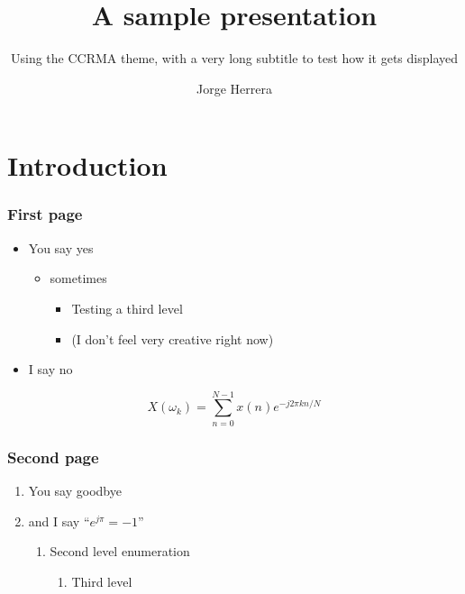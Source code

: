 \documentclass{beamer}
\title{A sample presentation}
\subtitle{Using the CCRMA theme, with a very long subtitle to test how it gets displayed}
\author{Jorge Herrera}
\date
\begin{document}
\begin{frame}[plain]
    \titlepage
\end{frame}
\addtocounter{framenumber}{-1}  %


\begin{frame}[plain]
    \tableofcontents
\end{frame}
\addtocounter{framenumber}{-1}  %

\section[Intro]{Introduction}
\begin{frame}[plain]
    \tableofcontents[currentsection]
\end{frame}
\addtocounter{framenumber}{-1}  %

\begin{frame}\frametitle{First page}
    \begin{itemize}
    \item You say yes
        \begin{itemize}
        \item sometimes
            \begin{itemize}
            \item Testing a third level
            \item (I don't feel very creative right now)
            \end{itemize}
        \end{itemize}
    \item I say no
    \end{itemize}

    \begin{equation}
    X(\omega_k) = \sum_{n=0}^{N-1}x(n)e^{-j2\pi kn/N}
    \end{equation}

\end{frame}

\begin{frame}\frametitle{Second page}
    \begin{enumerate}
    \item You say goodbye
    \item and I say ``$e^{j \pi} = -1$''
        \begin{enumerate}
        \item Second level enumeration
            \begin{enumerate}
            \item Third level
            \end{enumerate}
        \end{enumerate}
    \end{enumerate}
\end{frame}
\end{document}
